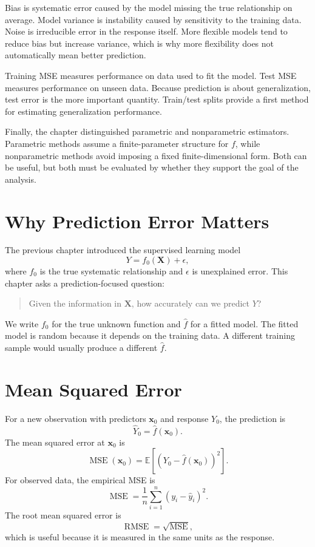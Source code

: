 {Bias is systematic error caused by the model missing the true relationship on average.  Model variance is instability caused by sensitivity to the training data.  Noise is irreducible error in the response itself.  More flexible models tend to reduce bias but increase variance, which is why more flexibility does not automatically mean better prediction.

Training MSE measures performance on data used to fit the model.  Test MSE measures performance on unseen data.  Because prediction is about generalization, test error is the more important quantity.  Train/test splits provide a first method for estimating generalization performance.

Finally, the chapter distinguished parametric and nonparametric estimators.  Parametric methods assume a finite-parameter structure for $f$, while nonparametric methods avoid imposing a fixed finite-dimensional form.  Both can be useful, but both must be evaluated by whether they support the goal of the analysis.
}{
\section{Why Prediction Error Matters}

The previous chapter introduced the supervised learning model
\begin{equation}
  Y=f_0(\mathbf{X})+\epsilon,
  \label{eq:ch2-true-model}
\end{equation}
where $f_0$ is the true systematic relationship and $\epsilon$ is unexplained error.  This chapter asks a prediction-focused question:
\begin{quote}
  Given the information in $\mathbf{X}$, how accurately can we predict $Y$?
\end{quote}
We write $f_0$ for the true unknown function and $\hat f$ for a fitted model.  The fitted model is random because it depends on the training data.  A different training sample would usually produce a different $\hat f$.

\section{Mean Squared Error}

For a new observation with predictors $\mathbf{x}_0$ and response $Y_0$, the prediction is
\[
  \widehat{Y}_0=\hat f(\mathbf{x}_0).
\]
The mean squared error at $\mathbf{x}_0$ is
\begin{equation}
  \operatorname{MSE}(\mathbf{x}_0)
  =\mathbb{E}\left[\left(Y_0-\hat f(\mathbf{x}_0)\right)^2\right].
  \label{eq:ch2-mse-fixed-x}
\end{equation}
For observed data, the empirical MSE is
\begin{equation}
  \operatorname{MSE}
  =\frac{1}{n}\sum_{i=1}^n (y_i-\hat y_i)^2.
  \label{eq:ch2-empirical-mse}
\end{equation}
The root mean squared error is
\begin{equation}
  \operatorname{RMSE}=\sqrt{\operatorname{MSE}},
  \label{eq:ch2-rmse}
\end{equation}
which is useful because it is measured in the same units as the response.

}
